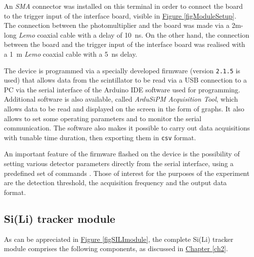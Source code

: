 \noindent
An \textit{SMA} connector was installed on this terminal in order to connect the board to the trigger input of the interface board, visible in \hyperref[figModuleSetup]{Figure \ref{figModuleSetup}}. The connection between the photomultiplier and the board was made via a 2m-long \textit{Lemo} coaxial cable with a delay of \SI{10}{\nano\second}. On the other hand, the connection between the board and the trigger input of the interface board was realised with a \SI{1}{\meter} \textit{Lemo} coaxial cable with a \SI{5}{\nano\second} delay.

\par
The device is programmed via a specially developed firmware (version \texttt{2.1.5} is used) that allows data from the scintillator to be read via a USB connection to a PC via the serial interface of the Arduino IDE software used for programming. Additional software is also available, called \textit{ArduSiPM Acquisition Tool}, which allows data to be read and displayed on the screen in the form of graphs. It also allows to set some operating parameters and to monitor the serial communication. The software also makes it possible to carry out data acquisitions with tunable time duration, then exporting them in \texttt{csv} format.

\par
An important feature of the firmware flashed on the device is the possibility of setting various detector parameters directly from the serial interface, using a predefined set of commands \cite{bocci_2022_ardusipm}. Those of interest for the purposes of the experiment are the detection threshold, the acquisition frequency and the output data format.


\subsection{Si(Li) tracker module}
\label{siliModule}
\par
As can be appreciated in \hyperref[figSILImodule]{Figure \ref{figSILImodule}}, the complete Si(Li) tracker module comprises the following components, as discussed in \hyperref[ch2]{Chapter \ref{ch2}}.

